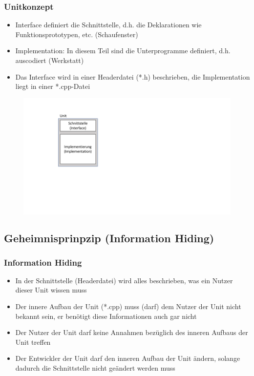 \subsubsection{Unitkonzept}
\label{sec:Unitkonzept}
\begin{itemize}
	\item Interface definiert die Schnittstelle, d.h. die Deklarationen wie Funktionsprototypen, etc. (Schaufenster)
	\item Implementation: In diesem Teil sind die Unterprogramme definiert, d.h. auscodiert (Werkstatt)
	\item Das Interface wird in einer Headerdatei (*.h) beschrieben, die Implementation liegt in einer *.cpp-Datei
\end{itemize}
\noindent
\begin{figure}[hh]
	\centering
	\includegraphics[width=0.3\linewidth]{images/unit1.pdf}
\end{figure}

\subsection{Geheimnisprinpzip (Information Hiding)}
\label{sec:Geheimnisprinzip (Information Hiding)}

\subsubsection{Information Hiding}
\label{sec:Information Hiding}
\begin{itemize}
	\item In der Schnittstelle (Headerdatei) wird alles beschrieben, was ein Nutzer dieser Unit wissen muss
	\item Der innere Aufbau der Unit (*.cpp) muss (darf) dem Nutzer der Unit nicht bekannt sein, er benötigt diese Informationen auch gar nicht
	\item Der Nutzer der Unit darf keine Annahmen bezüglich des inneren Aufbaus der Unit treffen
	\item Der Entwickler der Unit darf den inneren Aufbau der Unit ändern, solange dadurch die Schnittstelle nicht geändert werden muss
\end{itemize}

